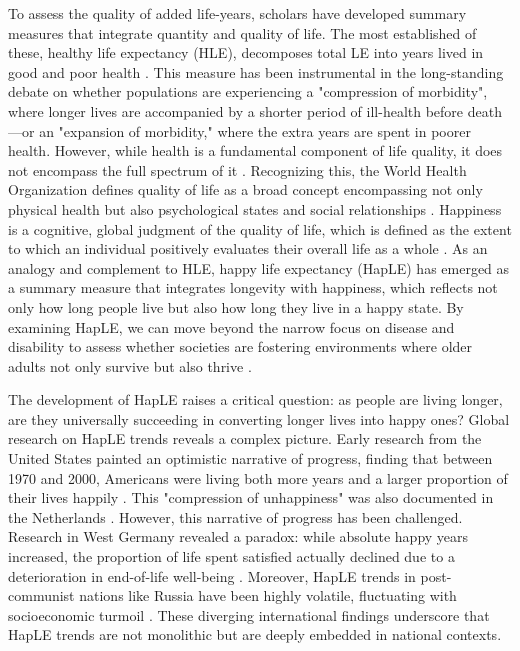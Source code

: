 \documentclass[12pt, a4paper]{article}
\begin{document}
To assess the quality of added life-years, scholars have developed summary measures that integrate quantity and quality of life. The most established of these, healthy life expectancy (HLE), decomposes total LE into years lived in good and poor health \autocite{sanders.1964.measuring}. This measure has been instrumental in the long-standing debate on whether populations are experiencing a "compression of morbidity", where longer lives are accompanied by a shorter period of ill-health before death \autocite{fries.1980.aging}—or an "expansion of morbidity," where the extra years are spent in poorer health\autocite{gruenberg.1977.failures}. However, while health is a fundamental component of life quality, it does not encompass the full spectrum of it \autocite{yang.2008.long}. Recognizing this, the World Health Organization defines quality of life as a broad concept encompassing not only physical health but also psychological states and social relationships \autocite{thewhoqolgroup.1998.development}. Happiness is a cognitive, global judgment of the quality of life, which is defined as the extent to which an individual positively evaluates their overall life as a whole \autocite{veenhoven.1996.study}. As an analogy and complement to HLE, happy life expectancy (HapLE) has emerged as a summary measure that integrates longevity with happiness, which reflects not only how long people live but also how long they live in a happy state. By examining HapLE, we can move beyond the narrow focus on disease and disability to assess whether societies are fostering environments where older adults not only survive but also thrive \autocite{yang.2008.long}.

The development of HapLE raises a critical question: as people are living longer, are they universally succeeding in converting longer lives into happy ones? Global research on HapLE trends reveals a complex picture. Early research from the United States painted an optimistic narrative of progress, finding that between 1970 and 2000, Americans were living both more years and a larger proportion of their lives happily \autocite{yang.2008.long,yang.2010.increment}. This "compression of unhappiness" was also documented in the Netherlands \autocite{perenboom.2004.trends}. However, this narrative of progress has been challenged. Research in West Germany revealed a paradox: while absolute happy years increased, the proportion of life spent satisfied actually declined due to a deterioration in end-of-life well-being \autocite{nemitz.2022.increasing}. Moreover, HapLE trends in post-communist nations like Russia have been highly volatile, fluctuating with socioeconomic turmoil \autocite{minagawa.2022.trends}. These diverging international findings underscore that HapLE trends are not monolithic but are deeply embedded in national contexts.
\end{document}
